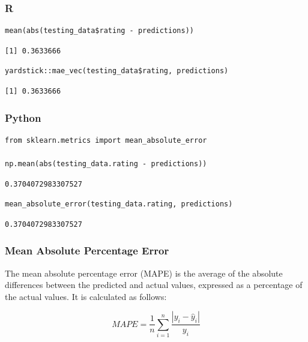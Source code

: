 \documentclass[
  letterpaper,
]{krantz}
\begin{document}
\subsubsection{R}

\begin{verbatim}
mean(abs(testing_data$rating - predictions))
\end{verbatim}

\begin{verbatim}
[1] 0.3633666
\end{verbatim}

\begin{verbatim}
yardstick::mae_vec(testing_data$rating, predictions)
\end{verbatim}

\begin{verbatim}
[1] 0.3633666
\end{verbatim}

\subsubsection{Python}

\begin{verbatim}
from sklearn.metrics import mean_absolute_error

np.mean(abs(testing_data.rating - predictions))
\end{verbatim}

\begin{verbatim}
0.3704072983307527
\end{verbatim}

\begin{verbatim}
mean_absolute_error(testing_data.rating, predictions)
\end{verbatim}

\begin{verbatim}
0.3704072983307527
\end{verbatim}

\subsubsection{Mean Absolute Percentage
Error}\label{sec-knowing-metrics-mape}

The mean absolute percentage error (MAPE) is the average of the absolute
differences between the predicted and actual values, expressed as a
percentage of the actual values. It is calculated as follows:

\[MAPE = \frac{1}{n}\sum_{i=1}^{n}\frac{|y_i - \hat{y}_i|}{y_i}\]
\end{document}
